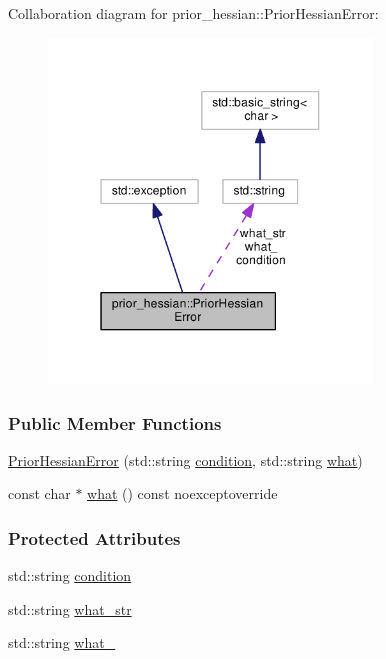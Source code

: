 Collaboration diagram for prior\+\_\+hessian\+:\+:Prior\+Hessian\+Error\+:\nopagebreak
\begin{figure}[H]
\begin{center}
\leavevmode
\includegraphics[width=244pt]{classprior__hessian_1_1PriorHessianError__coll__graph}
\end{center}
\end{figure}
\subsubsection*{Public Member Functions}
\begin{DoxyCompactItemize}
\item 
\hyperlink{classprior__hessian_1_1PriorHessianError_a8ff396c0b9e7c5799adedcadd086c5a1}{Prior\+Hessian\+Error} (std\+::string \hyperlink{classprior__hessian_1_1PriorHessianError_a0f00dbb23dc6ba9b3577503755b018c5}{condition}, std\+::string \hyperlink{classprior__hessian_1_1PriorHessianError_a0d1812ff85f88f12c0fffd12f523263d}{what})
\item 
const char $\ast$ \hyperlink{classprior__hessian_1_1PriorHessianError_a0d1812ff85f88f12c0fffd12f523263d}{what} () const noexceptoverride
\end{DoxyCompactItemize}
\subsubsection*{Protected Attributes}
\begin{DoxyCompactItemize}
\item 
std\+::string \hyperlink{classprior__hessian_1_1PriorHessianError_a0f00dbb23dc6ba9b3577503755b018c5}{condition}
\item 
std\+::string \hyperlink{classprior__hessian_1_1PriorHessianError_a0d97e1b6b1bcf6a440400706f416375e}{what\+\_\+str}
\item 
std\+::string \hyperlink{classprior__hessian_1_1PriorHessianError_a018e11b5863c2a3a06d37a16a89b14b2}{what\+\_\+}
\end{DoxyCompactItemize}


